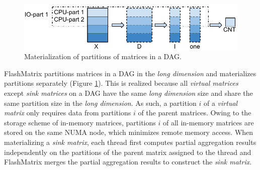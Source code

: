 \begin{figure}
	\centering
	\includegraphics[scale=0.6]{FlashMatrix_figs/materialize.pdf}
	\caption{Materialization of partitions of matrices in a DAG.}
	\label{fig:mater}
\end{figure}

FlashMatrix partitions matrices in a DAG in the \textit{long dimension} and
materializes partitions separately (Figure \ref{fig:mater}). This is realized
because all \textit{virtual matrices} except \textit{sink matrices} on a DAG
have the same \textit{long dimension} size and share the same partition size
in the \textit{long dimension}. As such, a partition $i$ of a \textit{virtual
matrix} only requires data from partitions $i$ of the parent matrices. Owing to
the storage scheme of in-memory matrices, partitions $i$ of all in-memory
matrices are stored on the same NUMA node, which minimizes remote memory access.
When materializing a \textit{sink matrix}, each thread first computes partial
aggregation results independently on the partitions of the parent matrix
assigned to the thread and FlashMatrix merges the partial aggregation results
to construct the \textit{sink matrix}.



